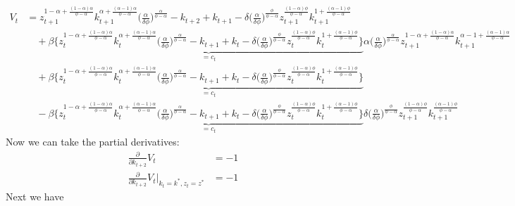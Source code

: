 \documentclass[a4paper]{article}
\theoremstyle{definition}
\begin{document}
	\begin{align*}
	V_t 	&= z_{t+1}^{1-\alpha+\frac{(1-\alpha)\alpha}{\phi-\alpha}} k_{t+1}^{\alpha+\frac{(\alpha-1)\alpha}{\phi-\alpha}} \Big( \frac{\alpha}{\delta\phi} \Big)^{\frac{\alpha}{\phi-\alpha}}-k_{t+2} + k_{t+1} - \delta \Big( \frac{\alpha}{\delta\phi} \Big)^{\frac{\phi}{\phi-\alpha}}z_{t+1}^{\frac{(1-\alpha)\phi}{\phi-\alpha}}k_{t+1}^{1+\frac{(\alpha-1)\phi}{\phi-\alpha}} \\
			&\quad + \beta \underbrace{\Big\{ z_{t}^{1-\alpha+\frac{(1-\alpha)\alpha}{\phi-\alpha}} k_{t}^{\alpha+\frac{(\alpha-1)\alpha}{\phi-\alpha}} \Big( \frac{\alpha}{\delta\phi} \Big)^{\frac{\alpha}{\phi-\alpha}}-k_{t+1} + k_{t} - \delta \Big( \frac{\alpha}{\delta\phi} \Big)^{\frac{\phi}{\phi-\alpha}}z_{t}^{\frac{(1-\alpha)\phi}{\phi-\alpha}}k_{t}^{1+\frac{(\alpha-1)\phi}{\phi-\alpha}} \Big\}}_{=c_t} \alpha \Big( \frac{\alpha}{\delta\phi} \Big)^{\frac{\alpha}{\phi-\alpha}} z_{t+1}^{1-\alpha+\frac{(1-\alpha)\alpha}{\phi-\alpha}}k_{t+1}^{\alpha-1+\frac{(\alpha-1)\alpha}{\phi-\alpha}} \\
			&\quad + \beta \underbrace{\Big\{ z_{t}^{1-\alpha+\frac{(1-\alpha)\alpha}{\phi-\alpha}} k_{t}^{\alpha+\frac{(\alpha-1)\alpha}{\phi-\alpha}} \Big( \frac{\alpha}{\delta\phi} \Big)^{\frac{\alpha}{\phi-\alpha}}-k_{t+1} + k_{t} - \delta \Big( \frac{\alpha}{\delta\phi} \Big)^{\frac{\phi}{\phi-\alpha}}z_{t}^{\frac{(1-\alpha)\phi}{\phi-\alpha}}k_{t}^{1+\frac{(\alpha-1)\phi}{\phi-\alpha}} \Big\}}_{=c_t} \\
			&\quad - \beta \underbrace{\Big\{ z_{t}^{1-\alpha+\frac{(1-\alpha)\alpha}{\phi-\alpha}} k_{t}^{\alpha+\frac{(\alpha-1)\alpha}{\phi-\alpha}} \Big( \frac{\alpha}{\delta\phi} \Big)^{\frac{\alpha}{\phi-\alpha}}-k_{t+1} + k_{t} - \delta \Big( \frac{\alpha}{\delta\phi} \Big)^{\frac{\phi}{\phi-\alpha}}z_{t}^{\frac{(1-\alpha)\phi}{\phi-\alpha}}k_{t}^{1+\frac{(\alpha-1)\phi}{\phi-\alpha}} \Big\}}_{=c_t} \delta \Big( \frac{\alpha}{\delta\phi} \Big)^{\frac{\phi}{\phi-\alpha}}z_{t+1}^{\frac{(1-\alpha)\phi}{\phi-\alpha}}k_{t+1}^{\frac{(\alpha-1)\phi}{\phi-\alpha}}
	\end{align*}	
Now we can take the partial derivatives:
	\begin{align*}
	\frac{\partial}{\partial k_{t+2}}V_t 									&= -1  \\
	\frac{\partial}{\partial k_{t+2}}V_t |_{k_{t}=k^*,z_{t}=z^*} 	&= -1 
	\end{align*}	
Next we have	
\end{document}
